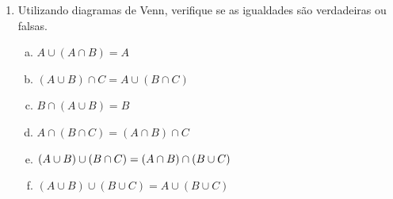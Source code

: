 \documentclass[a4paper,14pt]{article}
\begin{document}
\begin{multicols}{2}
\begin{enumerate}
\begin{enumerate}[a)]
    				\item $A \cap B = B$ \\\\\\\\
    				\item $A \cup B = A$ \\\\\\\\
    				\item $A \cap B = \varnothing$ \\\\\\\\
    				\item $A \cup B = A \cap B$ \\\\\\\\
    			\end{enumerate}
    			\textbf{Desafio olímpico} \\\\
    			\noindent Na figura ao lado há três circunferências que formam sete regiões. Em cada uma delas há um número obtido a partir da soma dos números escritos nas regiões vizinhas. Sabendo-se que duas regiões são vizinhas quando seus limites têm mais de um ponto comum, o valor de $x$ indicado na figura é: \\\\
    			\textbf{a)} -3 ~ \textbf{b)} 4 ~ \textbf{c)} -2 ~ \textbf{d)} 3 ~ \textbf{e)} -1 \newpage
    			\item Utilizando diagramas de Venn, verifique se as igualdades são verdadeiras ou falsas.
    			\begin{enumerate}[a)]
    				\item $A \cup (A \cap B) = A$
    				\item $(A \cup B) \cap C = A \cup (B \cap C)$
    				\item $B \cap (A \cup B) = B$
    				\item $A \cap (B \cap C) = (A \cap B) \cap C$
    				\item $(A \cup B) \cup (B \cap C) = \\ (A \cap B) \cap (B \cup C)$
    				\item $(A \cup B) \cup (B \cup C) = A \cup (B \cup C)$
    			\end{enumerate}

\end{enumerate}
\end{multicols}
\end{document}
